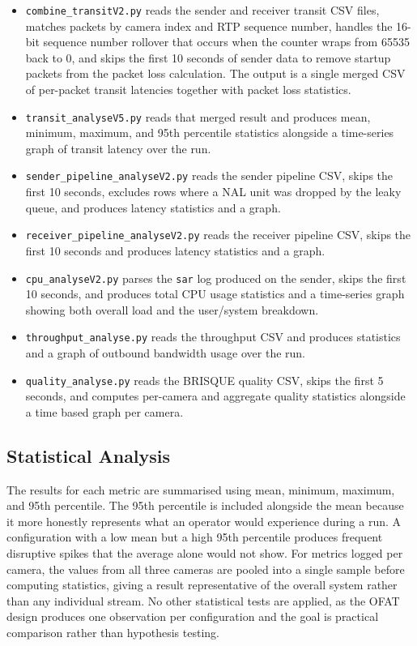 \begin{itemize}
    \item \texttt{combine\_transitV2.py} reads the sender and receiver transit CSV files, matches packets by camera index and RTP sequence number, handles the 16-bit sequence number rollover that occurs when the counter wraps from 65535 back to 0, and skips the first 10 seconds of sender data to remove startup packets from the packet loss calculation. The output is a single merged CSV of per-packet transit latencies together with packet loss statistics.
    \item \texttt{transit\_analyseV5.py} reads that merged result and produces mean, minimum, maximum, and 95th percentile statistics alongside a time-series graph of transit latency over the run.
    \item \texttt{sender\_pipeline\_analyseV2.py} reads the sender pipeline CSV, skips the first 10 seconds, excludes rows where a NAL unit was dropped by the leaky queue, and produces latency statistics and a graph.
    \item \texttt{receiver\_pipeline\_analyseV2.py} reads the receiver pipeline CSV, skips the first 10 seconds and produces latency statistics and a graph.
    \item \texttt{cpu\_analyseV2.py} parses the \texttt{sar} log produced on the sender, skips the first 10 seconds, and produces total CPU usage statistics and a time-series graph showing both overall load and the user/system breakdown.
    \item \texttt{throughput\_analyse.py} reads the throughput CSV and produces statistics and a graph of outbound bandwidth usage over the run.
    \item \texttt{quality\_analyse.py} reads the BRISQUE quality CSV, skips the first 5 seconds, and computes per-camera and aggregate quality statistics alongside a time based graph per camera.
\end{itemize}

\subsection{Statistical Analysis}

The results for each metric are summarised using mean, minimum, maximum, and 95th percentile. The 95th percentile is included alongside the mean because it more honestly represents what an operator would experience during a run. A configuration with a low mean but a high 95th percentile produces frequent disruptive spikes that the average alone would not show. For metrics logged per camera, the values from all three cameras are pooled into a single sample before computing statistics, giving a result representative of the overall system rather than any individual stream. No other statistical tests are applied, as the OFAT design produces one observation per configuration and the goal is practical comparison rather than hypothesis testing.

